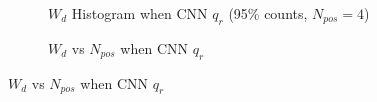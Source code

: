 \begin{figure}[H]
\begin{minipage}[t]{.5\textwidth}
\begin{figure}[H]
    \centering
    \resizebox{\textwidth}{!}{}
    \caption{\label{fig:cnn-hist} $W_{d}$ Histogram when CNN $q_{r}$ (95\% counts, $N_{pos}=4$)}
\end{figure}
\end{minipage}
\begin{minipage}[t]{.5\textwidth}
\begin{figure}[H]
    \centering
    \resizebox{\textwidth}{!}{}
    \caption{\label{fig:cnn-npos}$W_{d}$ vs $N_{pos}$ when CNN $q_{r}$}
\end{figure}
\end{minipage}
\end{figure}

